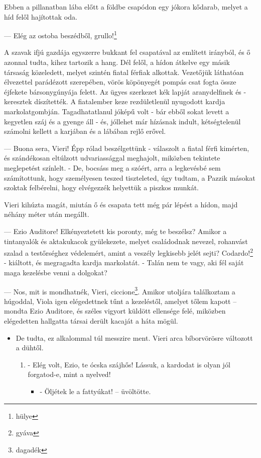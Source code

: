 \documentclass{thesis-ekf}
\theoremstyle{definition}
\theoremstyle{remark}
\begin{document}
Ebben  a  pillanatban  lába  előtt  a  földbe  csapódon  egy  jókora 
kődarab, melyet a híd felől hajítottak oda. 

— Elég az ostoba beszédből, grullo!\footnote{hülye}

A szavak ifjú gazdája egyszerre bukkant fel csapatával az említett 
irányból, és ő azonnal tudta, kihez tartozik a hang. Dél felől, a hídon átkelve egy másik társaság közeledett, melyet szintén fiatal férfiak 
alkottak. Vezetőjük láthatóan élvezettel parádézott szerepében, vörös 
köpönyegét pompás csat fogta össze éjfekete bársonygúnyája felett. 
Az ügyes szerkezet kék lapját aranydelfinek és -keresztek díszítették. 
A fiatalember keze rezdületlenül nyugodott kardja markolatgombján. 
Tagadhatatlanul jóképű volt - bár ebből sokat levett a kegyetlen száj 
és  a  gyenge  áll - és,  jóllehet  már  hízásnak  indult,  kétségtelenül 
számolni kellett a karjában és a lábában rejlő erővel. 

— Buona sera, Vieri! Épp rólad beszélgettünk - válaszolt a fiatal 
férfi  kimérten,  és  szándékosan  eltúlzott  udvariassággal  meghajolt, 
miközben tekintete meglepetést színlelt. - De, bocsáss meg a szóért, 
arra  a  legkevésbé  sem  számítottunk,  hogy  személyesen  teszed 
tiszteleted, úgy tudtam, a Pazzik másokat szoktak felbérelni, hogy 
elvégezzék helyettük a piszkos munkát. 

Vieri kihúzta  magát, miután ő és csapata tett még pár  lépést a 
hídon, majd néhány méter után megállt. 

— Ezio  Auditore!  Elkényeztetett  kis  poronty,  még  te  beszélsz? 
Amikor  a  tintanyalók  és  aktakukacok  gyülekezete,  melyet 
családodnak  nevezel,  rohanvást  szalad  a  testőrséghez  védelemért, 
amint  a  veszély  legkisebb  jelét  sejti?  Codardo!\footnote{gyáva}  -  kiáltott,  és 
megragadta kardja  markolatát. - Talán  nem te vagy, aki  fél  saját 
maga kezelésbe venni a dolgokat? 

— Nos,  mit  is  mondhatnék,  Vieri,  ciccione\footnote{dagadék}.  Amikor  utoljára 
találkoztam a húgoddal, Viola igen elégedettnek tűnt a kezeléstől, 
amelyet  tőlem  kapott  -- mondta  Ezio  Auditore,  és  széles  vigyort 
küldött ellensége felé, miközben elégedetten hallgatta társai derült 
kacaját a háta mögül. 

\begin{itemize}
    \item De  tudta, ez alkalommal túl messzire  ment. Vieri arca bíborvörösre változott a dühtől. 
    \begin{enumerate}
        \item - Elég volt, Ezio, te ócska szájhős! Lássuk, a kardodat is olyan jól forgatod-e, mint a nyelved!
        \begin{itemize}
            \item - Öljétek le a fattyúkat! -- üvöltötte.
        \end{itemize}
    \end{enumerate}
\end{itemize}
\end{document}
